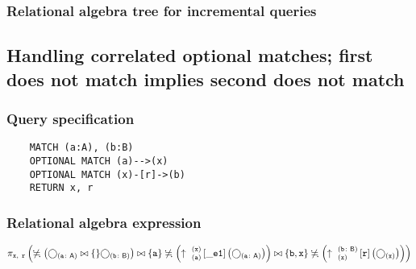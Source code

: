 	\subsubsection*{Relational algebra tree for incremental queries}

	\subsection{Handling correlated optional matches; first does not match implies second does not match}

	\subsubsection*{Query specification}

	\begin{lstlisting}
	MATCH (a:A), (b:B)
	OPTIONAL MATCH (a)-->(x)
	OPTIONAL MATCH (x)-[r]->(b)
	RETURN x, r
	\end{lstlisting}


	\subsubsection*{Relational algebra expression}

	$\projection{\var{x},~\var{r}} \left(\alldifferent{} \left(\getvertices{a}{A} \join \{\} \getvertices{b}{B}\right) \join \{\var{a}\} \alldifferent{} \left(\expandout{a}{x}{}{\_e1}{} \left(\getvertices{a}{A}\right)\right) \join \{\var{b}, \var{x}\} \alldifferent{} \left(\expandout{x}{b}{B}{r}{} \left(\getvertices{x}{}\right)\right)\right)$

